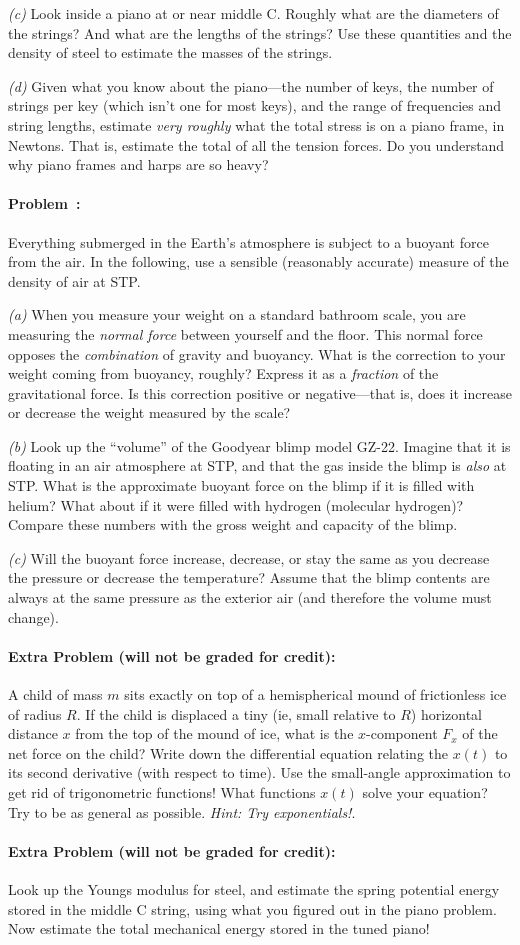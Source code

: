 \documentclass[12pt]{article}
\begin{document}
\textsl{(c)} Look inside a piano at or near middle C. Roughly what are
the diameters of the strings? And what are the lengths of the strings?
Use these quantities and the density of steel to estimate the masses
of the strings.

\textsl{(d)} Given what you know about the piano---the number of keys,
the number of strings per key (which isn't one for most keys), and the
range of frequencies and string lengths, estimate \emph{very roughly}
what the total stress is on a piano frame, in Newtons. That is,
estimate the total of all the tension forces. Do you understand why
piano frames and harps are so heavy?

\paragraph{Problem~\theproblem:}%
Everything submerged in the Earth's atmosphere is subject to a buoyant
force from the air.  In the following, use a sensible (reasonably
accurate) measure of the density of air at STP.

\textsl{(a)} When you measure your weight on a standard bathroom
scale, you are measuring the \emph{normal force} between yourself and
the floor.  This normal force opposes the \emph{combination} of
gravity and buoyancy.  What is the correction to your weight coming
from buoyancy, roughly?  Express it as a \emph{fraction} of the
gravitational force.  Is this correction positive or negative---that
is, does it increase or decrease the weight measured by the scale?

\textsl{(b)} Look up the ``volume'' of the Goodyear blimp model GZ-22.
Imagine that it is floating in an air atmosphere at STP, and that the
gas inside the blimp is \emph{also} at STP.  What is the approximate
buoyant force on the blimp if it is filled with helium?  What about if
it were filled with hydrogen (molecular hydrogen)?  Compare these
numbers with the gross weight and capacity of the blimp.

\textsl{(c)} Will the buoyant force increase, decrease, or stay the
same as you decrease the pressure or decrease the temperature?
Assume that the blimp contents are always at the same pressure as the
exterior air (and therefore the volume must change).

\paragraph{Extra Problem (will not be graded for credit):}%
A child of mass $m$ sits exactly on top of a hemispherical mound of
frictionless ice of radius $R$.  If the child is displaced a tiny (ie,
small relative to $R$) horizontal distance $x$ from the top of the
mound of ice, what is the $x$-component $F_x$ of the net force on the
child?  Write down the differential equation relating the $x(t)$ to
its second derivative (with respect to time).  Use the small-angle
approximation to get rid of trigonometric functions! What functions
$x(t)$ solve your equation?  Try to be as general as possible.
\emph{Hint: Try exponentials!}.

\paragraph{Extra Problem (will not be graded for credit):}%
Look up the Youngs modulus for steel, and estimate the spring
potential energy stored in the middle C string, using what you figured
out in the piano problem. Now estimate the total mechanical energy
stored in the tuned piano!
\end{document}
